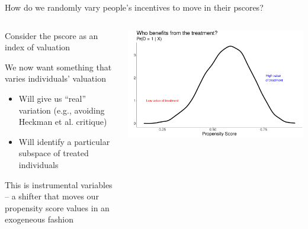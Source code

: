 \documentclass[notes,11pt, aspectratio=169]{beamer}
\newenvironment{wideitemize}{\itemize\addtolength{\itemsep}{10pt}}{\enditemize}
\begin{document}
\begin{frame}{How do we randomly vary people's incentives to move in their pscores?}
\begin{columns}[T] %
\begin{column}{.5\textwidth}
  \begin{wideitemize}
  \item Consider the pscore as an index of valuation
  \item We now want something that varies individuals' valuation
    \begin{itemize}
    \item Will give us ``real'' variation (e.g., avoiding Heckman et al. critique)
    \item Will identify a particular subspace of treated individuals
    \end{itemize}
  \item This is instrumental variables -- a shifter that moves our
    propensity score values in an exogeneous fashion
  \end{wideitemize}
\end{column}%
\hfill%
\begin{column}{.5\textwidth}
\includegraphics[width=\linewidth]{images/overlap3.pdf}
\end{column}%
\end{columns}
\end{frame}
\end{document}
